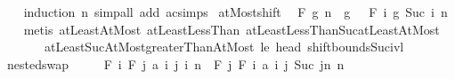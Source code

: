 \begin{isabellebody}
%
\isadelimproof
\ \ %
\endisadelimproof
%
\isatagproof
{}\isamarkupfalse%
\ {\isacharparenleft}{\kern0pt}induction\ n{\isacharparenright}{\kern0pt}\ {\isacharparenleft}{\kern0pt}simp{\isacharunderscore}{\kern0pt}all\ add{\isacharcolon}{\kern0pt}\ ac{\isacharunderscore}{\kern0pt}simps{\isacharparenright}{\kern0pt}%
\endisatagproof
{\isafoldproof}%
%
\isadelimproof
\isanewline
%
\endisadelimproof
\isanewline
{}\isamarkupfalse%
\ atMost{\isacharunderscore}{\kern0pt}shift{\isacharcolon}{\kern0pt}\isanewline
\ \ {\isachardoublequoteopen}F\ g\ {\isacharbraceleft}{\kern0pt}{\isachardot}{\kern0pt}{\isachardot}{\kern0pt}n{\isacharbraceright}{\kern0pt}\ {\isacharequal}{\kern0pt}\ g\ {}\ \isactrlbold {\isacharasterisk}{\kern0pt}\ F\ {\isacharparenleft}{\kern0pt}{\isasymlambda}i{\isachardot}{\kern0pt}\ g\ {\isacharparenleft}{\kern0pt}Suc\ i{\isacharparenright}{\kern0pt}{\isacharparenright}{\kern0pt}\ {\isacharbraceleft}{\kern0pt}{\isachardot}{\kern0pt}{\isachardot}{\kern0pt}{\isacharless}{\kern0pt}n{\isacharbraceright}{\kern0pt}{\isachardoublequoteclose}\isanewline
%
\isadelimproof
\ \ %
\endisadelimproof
%
\isatagproof
{}\isamarkupfalse%
\ {\isacharparenleft}{\kern0pt}metis\ atLeast{}AtMost\ atLeast{}LessThan\ atLeastLessThanSuc{\isacharunderscore}{\kern0pt}atLeastAtMost\ \isanewline
\ \ \ \ \ \ \ atLeastSucAtMost{\isacharunderscore}{\kern0pt}greaterThanAtMost\ le{}\ head\ shift{\isacharunderscore}{\kern0pt}bounds{\isacharunderscore}{\kern0pt}Suc{\isacharunderscore}{\kern0pt}ivl{\isacharparenright}{\kern0pt}%
\endisatagproof
{\isafoldproof}%
%
\isadelimproof
\isanewline
%
\endisadelimproof
\isanewline
{}\isamarkupfalse%
\ nested{\isacharunderscore}{\kern0pt}swap{\isacharcolon}{\kern0pt}\isanewline
\ \ \ \ \ {\isachardoublequoteopen}F\ {\isacharparenleft}{\kern0pt}{\isasymlambda}i{\isachardot}{\kern0pt}\ F\ {\isacharparenleft}{\kern0pt}{\isasymlambda}j{\isachardot}{\kern0pt}\ a\ i\ j{\isacharparenright}{\kern0pt}\ {\isacharbraceleft}{\kern0pt}{}{\isachardot}{\kern0pt}{\isachardot}{\kern0pt}{\isacharless}{\kern0pt}i{\isacharbraceright}{\kern0pt}{\isacharparenright}{\kern0pt}\ {\isacharbraceleft}{\kern0pt}{}{\isachardot}{\kern0pt}{\isachardot}{\kern0pt}n{\isacharbraceright}{\kern0pt}\ {\isacharequal}{\kern0pt}\ F\ {\isacharparenleft}{\kern0pt}{\isasymlambda}j{\isachardot}{\kern0pt}\ F\ {\isacharparenleft}{\kern0pt}{\isasymlambda}i{\isachardot}{\kern0pt}\ a\ i\ j{\isacharparenright}{\kern0pt}\ {\isacharbraceleft}{\kern0pt}Suc\ j{\isachardot}{\kern0pt}{\isachardot}{\kern0pt}n{\isacharbraceright}{\kern0pt}{\isacharparenright}{\kern0pt}\ {\isacharbraceleft}{\kern0pt}{}{\isachardot}{\kern0pt}{\isachardot}{\kern0pt}{\isacharless}{\kern0pt}n{\isacharbraceright}{\kern0pt}{\isachardoublequoteclose}\isanewline

\end{isabellebody}
